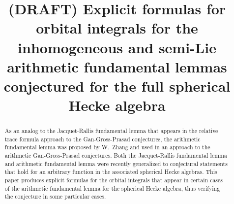 \documentclass[twoside]{mitthesis}
\begin{document}
\title{(DRAFT) Explicit formulas for orbital integrals for the
  inhomogeneous and semi-Lie arithmetic fundamental lemmas
  conjectured for the full spherical Hecke algebra}



\maketitle

\begin{abstract}
  As an analog to the Jacquet-Rallis fundamental lemma that appears in the
  relative trace formula approach to the Gan-Gross-Prasad conjectures,
  the arithmetic fundamental lemma was proposed by W.\ Zhang and used in an approach
  to the arithmetic Gan-Gross-Prasad conjectures.
  Both the Jacquet-Rallis fundamental lemma and arithmetic fundamental lemma
  were recently generalized to conjectural statements that hold
  for an arbitrary function in the associated spherical Hecke algebras.
  This paper produces explicit formulas for the orbital integrals that appear
  in certain cases of the arithmetic fundamental lemma for the spherical Hecke algebra,
  thus verifying the conjecture in some particular cases.
\end{abstract}

\doublespacing %



\tableofcontents
\listoffigures
\listoftables

















\printbibliography[title=References,heading=bibintoc]

\appendix
\end{document}
